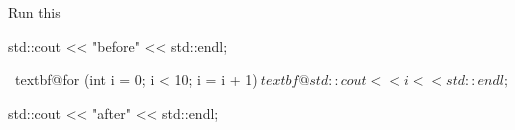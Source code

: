 Run this

\begin{console}[commandchars=\~\@\$]

std::cout << "before" << std::endl;



~textbf@for (int i = 0; i < 10; i = i + 1)$

    ~textbf@std::cout << i << std::endl;$

    

std::cout << "after" << std::endl;

\end{console}

